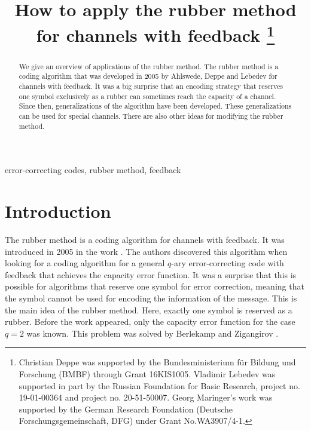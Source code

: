 \documentclass[conference]{IEEEtran}
\title{How to apply the rubber method for channels with feedback%
	\thanks{{\fontsize{5}{4}\selectfont Christian Deppe was supported by the Bundesministerium 
			f\"ur Bildung und Forschung (BMBF) through Grant 16KIS1005. Vladimir Lebedev was supported in part by the Russian Foundation for Basic Research, project no. 19-01-00364 and project no. 20-51-50007. Georg Maringer’s work was supported by the German Research Foundation (Deutsche Forschungsgemeinschaft, DFG) under Grant No.WA3907/4-1.}}}
\author{%
	\IEEEauthorblockN{Christian Deppe\IEEEauthorrefmark{1}, Georg Maringer\IEEEauthorrefmark{1}}
	\IEEEauthorblockLTI{christian.deppe@tum.de, georg.maringer@tum.de}
	\and
	\IEEEauthorblockN{Vladimir Lebedev}
	\IEEEauthorblockLNT{lebedev37@mail.ru}
}
\begin{document}
	\maketitle
	
	\begin{abstract}
	We give an overview of applications of the rubber method. The rubber method is a coding algorithm that was developed in 2005 by Ahlswede, Deppe and Lebedev for channels with feedback. It was a big surprise that an encoding strategy that reserves one symbol exclusively as a rubber can sometimes reach the capacity of a channel. Since then, generalizations of the algorithm have been developed. These generalizations can be used for special channels. There are also other ideas for modifying the rubber method.
	\end{abstract}
	
	\begin{IEEEkeywords}
		error-correcting codes, rubber method, feedback
	\end{IEEEkeywords}


\section{Introduction}\label{introduction}

The rubber method is a coding algorithm for channels with feedback. It was introduced in 2005 in the work \cite{ADL05}. The authors discovered this algorithm when looking for a coding algorithm for a general $q$-ary error-correcting code with feedback that achieves the capacity error function. It was a surprise that this is possible for algorithms that reserve one symbol for error correction, meaning that the symbol cannot be used for encoding the information of the message. This is the main idea of the rubber method. Here, exactly one symbol is reserved as a rubber. Before the work \cite{ADL05} appeared, only the capacity error function for the case $q = 2$ was known. This problem was solved by Berlekamp \cite{B68} and Zigangirov \cite{Z76}.
\end{document}

